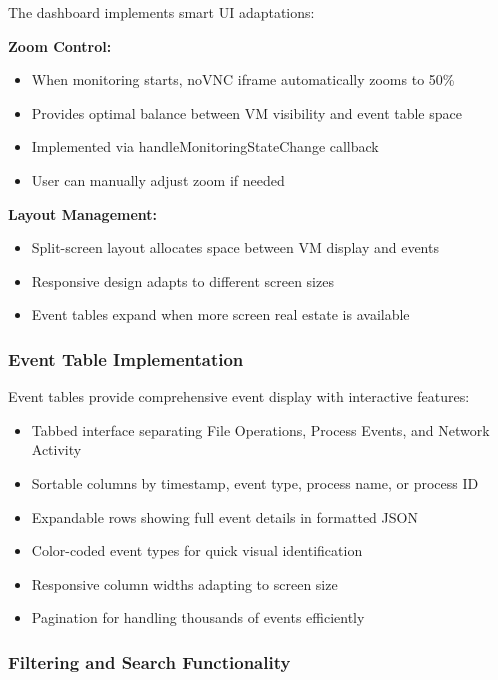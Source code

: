 The dashboard implements smart UI adaptations:

\textbf{Zoom Control:}
\begin{itemize}
    \item When monitoring starts, noVNC iframe automatically zooms to 50\%
    \item Provides optimal balance between VM visibility and event table space
    \item Implemented via handleMonitoringStateChange callback
    \item User can manually adjust zoom if needed
\end{itemize}

\textbf{Layout Management:}
\begin{itemize}
    \item Split-screen layout allocates space between VM display and events
    \item Responsive design adapts to different screen sizes
    \item Event tables expand when more screen real estate is available
\end{itemize}

\subsubsection{Event Table Implementation}

Event tables provide comprehensive event display with interactive features:

\begin{itemize}
    \item Tabbed interface separating File Operations, Process Events, and Network Activity
    \item Sortable columns by timestamp, event type, process name, or process ID
    \item Expandable rows showing full event details in formatted JSON
    \item Color-coded event types for quick visual identification
    \item Responsive column widths adapting to screen size
    \item Pagination for handling thousands of events efficiently
\end{itemize}

\subsubsection{Filtering and Search Functionality}

